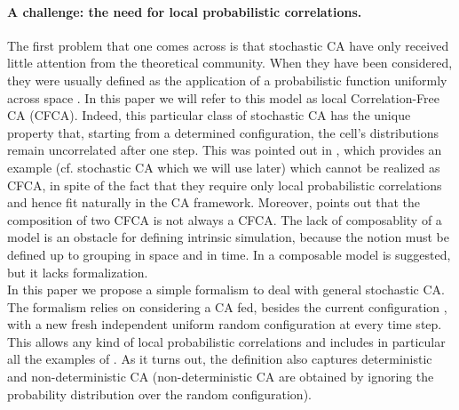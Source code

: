 \documentclass[submission]{fundam}
\begin{document}
\paragraph{A challenge: the need for local probabilistic correlations.} The first problem that one comes across is that stochastic CA have only received little attention from the theoretical community. When they have been considered, they were usually defined as the application of a probabilistic function uniformly across space \cite{Toom,Gacs,Fates,Mairesse,RST,FatesRST06}. In this paper we will refer to this model as local Correlation-Free CA (CFCA). Indeed, this particular class of stochastic CA has the unique property that, starting from a determined configuration, the cell's distributions remain uncorrelated after one step. This was pointed out in \cite{DBLP:conf/cie/ArrighiFNT11}, which provides an example (cf.  stochastic CA which we will use later) which cannot be realized as CFCA, in spite of the fact that they require only local probabilistic correlations and hence fit naturally in the CA framework. Moreover, \cite{DBLP:conf/cie/ArrighiFNT11} points out that the composition of two CFCA is not always a CFCA. The lack of composablity of a model is an obstacle for defining intrinsic simulation, because the notion must be defined up to grouping in space and in time. In \cite{DBLP:conf/cie/ArrighiFNT11} a composable model is suggested, but it lacks formalization.\\ 
In this paper we propose a simple formalism to deal with general stochastic CA. The formalism relies on considering a CA  fed, besides the current configuration , with a new fresh independent uniform random configuration  at every time step. This allows any kind of local probabilistic correlations and includes in particular all the examples of \cite{DBLP:conf/cie/ArrighiFNT11}. As it turns out, the definition also captures deterministic and non-deterministic CA (non-deterministic CA are obtained by ignoring the probability distribution over the random configuration). 
\end{document}
